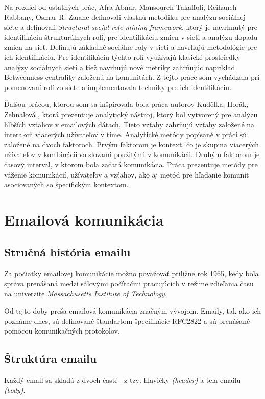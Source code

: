 \documentclass[slovak,master,public,dept460,male,cpdeclaration,oneside]{diploma}
\begin{document}
Na rozdiel od ostatných prác, Afra Abnar, Mansoureh Takaffoli, Reihaneh Rabbany, Osmar R. Zaıane \cite{9} definovali vlastnú metodiku pre analýzu sociálnej siete a definovali \textit{Structural social role mining framework}, ktorý je navrhnutý pre identifikáciu štrukturálnych rolí, pre identifikáciu zmien v sieti a analýzu dopadu zmien na sieť. Definujú základné sociálne roly v sieti a navrhujú metodológie pre ich identifikáciu. Pre identifikáciu týchto rolí využívajú klasické prostriedky analýzy sociálnych sietí a tiež navrhujú nové metriky zahrňujúc napríklad Betweenness centrality založenú na komunitách. Z tejto práce som vychádzala pri pomenovaní rolí zo siete a implementovala techniky pre ich identifikáciu.

Ďalšou prácou, ktorou som sa inšpirovala bola práca autorov Kudělka, Horák, Zehnalová \cite{10}, ktorá prezentuje analytický nástroj, ktorý bol vytvorený pre analýzu hlbších vzťahov v emailových dátach. Tieto vzťahy zahrňujú vzťahy založené na interakcii viacerých užívateľov v tíme. Analytické metódy popísané v práci sú založené na dvoch faktoroch. Prvým faktorom je kontext, čo je skupina viacerých užívateľov v kombinácii so slovami použitými v komunikácii. Druhým faktorom je časový interval, v ktorom bola začatá komunikácia. Práca prezentuje metódy pre váženie komunikácií, užívateľov a vzťahov, ako aj metód pre hľadanie komunít asociovaných so špecifickým kontextom. 

\section{Emailová komunikácia}
\subsection{Stručná história emailu}
Za počiatky emailovej komunikácie možno považovať priližne rok 1965, kedy bola správa prenášaná medzi sálovými počítačmi pracujúcich v režime zdieľania času na univerzite \textit{Massachusetts Institute of Technology}.

Od tejto doby preša emailová komunikácia značným vývojom. Emaily, tak ako ich poznáme dnes, sú definované štandartom špecifikácie RFC2822 a sú prenášané pomocou komunikačných protokolov. 


\subsection{Štruktúra emailu}
Každý email sa skladá z dvoch častí - z tzv. hlavičky \textit{(header)} a tela emailu \textit{(body)}.
\end{document}
